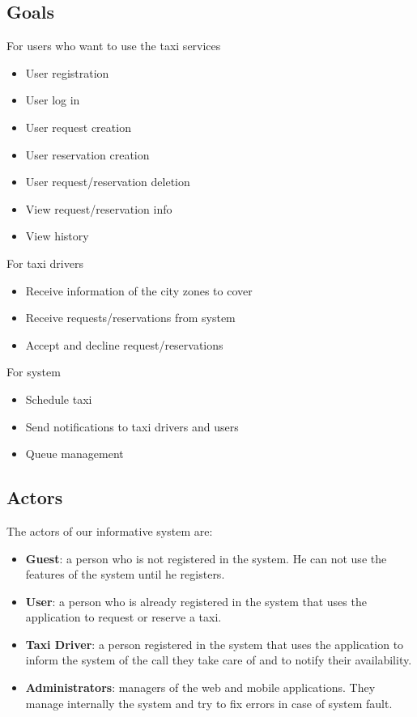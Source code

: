 \documentclass{article}
\begin{document}
	\subsection{Goals}
	    For users who want to use the taxi services
	    \begin{itemize}
    	    \item User registration
    	    \item User log in
    	    \item User request creation
    	    \item User reservation creation
    	    \item User request/reservation deletion
    	    \item View request/reservation info
    	    \item View history
	    \end{itemize}
	    
	    For taxi drivers
	    \begin{itemize}
    	    \item Receive information of the city zones to cover
    	    \item Receive requests/reservations from system
    	    \item Accept and decline request/reservations
	    \end{itemize}
	   
	    For system
	    \begin{itemize}
    	    \item Schedule taxi
    	    \item Send notifications to taxi drivers and users
    	    \item Queue management
	    \end{itemize}
	    
	\subsection{Actors}
    	The actors of our informative system are:
    	\begin{itemize}
    	    \item \textbf{Guest}: a person who is not registered in the system. He can not use the features of the system until he registers. 
    		\item \textbf{User}: a person who is already registered in the system that uses the application to request or reserve a taxi.
    		\item \textbf{Taxi Driver}: a person registered in the system that uses the application to inform the system of the call they take care of and to notify their availability.
    		\item \textbf{Administrators}: managers of the web and mobile applications. They manage internally the system and try to fix errors in case of system fault.
    	\end{itemize}
	
\end{document}
